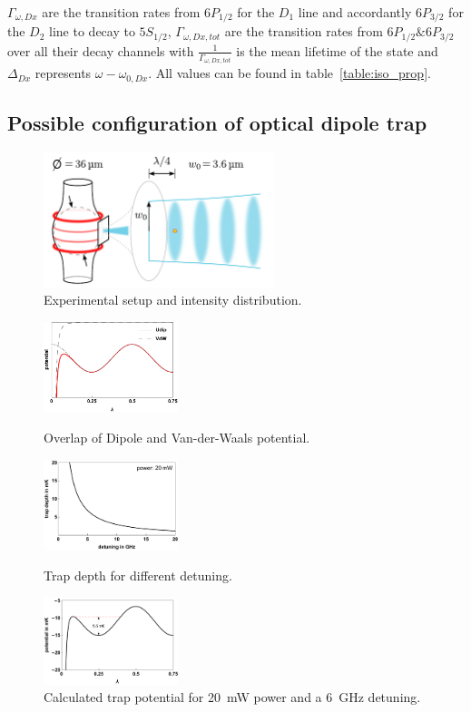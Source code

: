 %
\(\Gamma_{\omega,Dx} \) are the transition rates from \(6P_{1/2} \) for the \(D_1 \) line 
and accordantly \(6P_{3/2} \) for the \(D_2 \) line to decay to \(5S_{1/2} \), 
\(\Gamma_{\omega,Dx,tot} \) are the transition rates from \(6P_{1/2} \& 6P_{3/2} \) over
all their decay channels with \(\frac{1}{\Gamma_{\omega,Dx,tot}} \) is the mean lifetime
of the state and \(\Delta_{Dx} \) represents \(\omega - \omega_{0,Dx} \).
All values can be found in table~\ref{table:iso_prop}. 
\pagebreak

\subsection*{Possible configuration of optical dipole trap}
\begin{figure}[h]
    \centering
    \includegraphics[width=0.6\textwidth]{resonator_trap_label}
    \caption{\label{fig:resonator_trap_label} Experimental setup and intensity distribution. }
\end{figure}
\begin{figure}
    \includegraphics[width=0.35\textwidth]{potentialoverlap}    
    \caption{\label{fig:potentialoverlap} Overlap of Dipole and Van-der-Waals potential.}
    \vspace{2em}
    \includegraphics[width=0.35\textwidth]{detuningopt}    
    \caption{\label{fig:detuningopt} Trap depth for different detuning.}
    \vspace{2em}
    \includegraphics[width=0.35\textwidth]{trapdepth}    
    \caption{\label{fig:trapdepth} Calculated trap potential for \SI{20}{\milli\watt} power and a \SI{6}{\giga\hertz} detuning.}
\end{figure}
